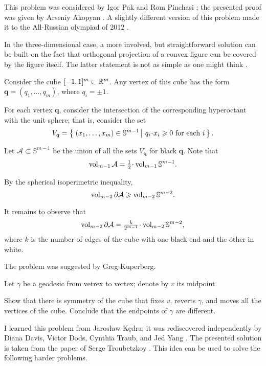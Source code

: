 This problem was considered by Igor Pak and Rom Pinchasi \cite{pak-pinchas};
the presented proof was given by Arseniy Akopyan \cite{akopyan-2012}.
A slightly different version of this problem made it to the All-Russian olympiad of 2012 \cite[№ 116774]{problems}.

In the three-dimensional case,
a more involved, but straightforward solution can be built on the fact that orthogonal projection of a convex figure can be covered by the figure itself.
The latter statement is not as simple as one might think  \cite[see][and the references therein]{kos-toroscik}.

Consider the cube $[-1,1]^m\subset \mathbb{R}^m$.
Any vertex of this cube has the form $\bm{q}=(q_1,\dots,q_m)$,
where  $q_i=\pm1$.

For each vertex $\bm{q}$,
consider the intersection of the corresponding hyperoctant with the unit sphere;
that is, consider the set
\[V_{\bm{q}}=\set{(x_1,\dots,x_m)\in\mathbb{S}^{m-1}}{q_i\cdot x_i\ge 0\ \text{for each}\ i}.\]

Let $\mathcal{A}\subset\mathbb{S}^{m-1}$ be the union of all the sets $V_{\bm{q}}$ for black $\bm{q}$.
Note that 
\[\vol_{m-1}\mathcal{A}=\tfrac12\cdot\vol_{m-1}\mathbb{S}^{m-1}.\]

By the spherical isoperimetric inequality,
\[\operatorname{\rm vol}\nolimits_{m-2}\partial\mathcal{A}
\geqslant \operatorname{\rm vol}\nolimits_{m-2}\mathbb{S}^{m-2}.\] 

It remains to observe that
\[\vol_{m-2}\partial\mathcal{A}
=
\tfrac k{2^{m-1}}\cdot\vol_{m-2}\mathbb{S}^{m-2},\]
where $k$ is the number of edges of the cube with one black end and the other in white.
\qeds

The problem was suggested by Greg Kuperberg.

Let $\gamma$ be a geodesic from vetrex to vertex;
denote by $v$ its midpoint.

Show that there is symmetry of the cube that fixes $v$, reverts $\gamma$, and moves all the vertices of the cube.
Conclude that the endpoints of $\gamma$ are different.
\qeds

I learned this problem from Jaros{\l}aw K\k{e}dra; 
it was rediscovered independently by
Diana Davis,
Victor Dods,
Cynthia Traub,
and Jed Yang \cite{DDTY}.
The presented solution is taken from the paper of Serge Troubetzkoy \cite{troubetzkoy}.
This idea can be used to solve the following harder problems.

